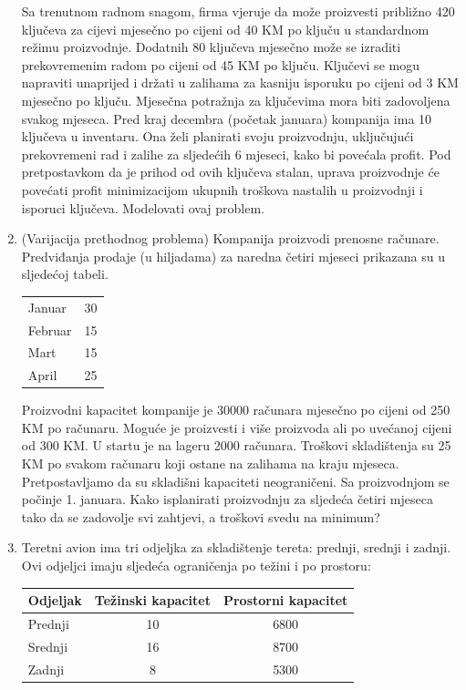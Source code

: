 \documentclass[a4paper, utf8, 11pt, colorlinks]{book}
\theoremstyle{definition}
\begin{document}
\begin{enumerate}
	Sa trenutnom radnom snagom, firma vjeruje da može proizvesti približno 420 ključeva za cijevi mjesečno po cijeni od 40 KM po ključu u standardnom režimu proizvodnje. Dodatnih 80 ključeva mjesečno može se izraditi prekovremenim radom po cijeni od 45 KM po ključu.
	Ključevi se mogu napraviti unaprijed i držati u zalihama za kasniju isporuku po cijeni od 3 KM mjesečno po ključu. Mjesečna potražnja za ključevima mora biti zadovoljena svakog mjeseca. Pred kraj decembra (početak januara) kompanija ima 10 ključeva u inventaru. Ona želi planirati svoju proizvodnju, uključujući prekovremeni rad i zalihe za sljedećih 6 mjeseci, kako bi povećala profit. Pod pretpostavkom da je prihod od ovih ključeva stalan, uprava proizvodnje  će povećati  profit minimizacijom ukupnih troškova nastalih u proizvodnji i isporuci ključeva. Modelovati ovaj problem.
	\item %
	(Varijacija prethodnog problema) Kompanija proizvodi prenosne računare. Predviđanja prodaje (u hiljadama) za naredna četiri mjeseci prikazana su u sljedećoj tabeli. 
\begin{center}
	\begin{tabular}{lc}\hline
		Januar  & 30 \\
		Februar & 15 \\
		Mart    & 15 \\
		April   & 25 \\
		\hline
	\end{tabular}  
\end{center}	
	
	Proizvodni kapacitet kompanije je 30000 računara mjesečno po cijeni od 250 KM po računaru. Moguće je proizvesti i više proizvoda ali po uvećanoj cijeni od 300 KM. U startu je na lageru 2000 računara. Troškovi skladištenja su 25 KM po svakom računaru koji ostane na zalihama na kraju mjeseca. Pretpostavljamo da su skladišni kapaciteti neograničeni. Sa proizvodnjom se počinje 1. januara. Kako isplanirati proizvodnju za sljedeća četiri mjeseca tako da se zadovolje svi zahtjevi, a troškovi svedu na minimum?
	\item Teretni avion ima tri odjeljka za skladištenje tereta: prednji, srednji i zadnji. Ovi odjeljci imaju sljedeća ograničenja po težini i po prostoru: 
\begin{table}[!ht]
	\centering
	\begin{tabular}{lcc}
	   Odjeljak   & Težinski kapacitet & Prostorni kapacitet \\ \hline
	   Prednji    & 10                 & 6800                 \\ 
	   Srednji  & 16                 & 8700                 \\
	   Zadnji   &  8                 & 5300                 \\ \hline
 	\end{tabular}
\end{table}
	

\end{enumerate}
\end{document}
